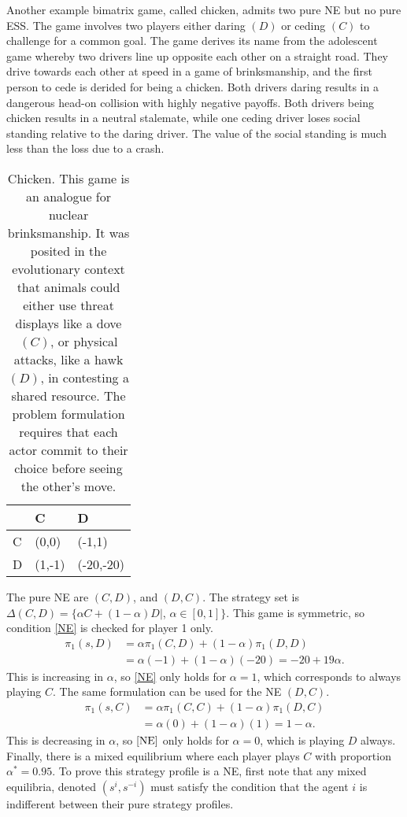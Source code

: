 Another example bimatrix game, called chicken, admits two pure NE but no pure ESS. The game involves two players either daring $(D)$ or ceding $(C)$ to challenge for a common goal. The game derives its name from the adolescent game whereby two drivers line up opposite each other on a straight road. They drive towards each other at speed in a game of brinksmanship, and the first person to cede is derided for being a chicken. Both drivers daring results in a dangerous head-on collision with highly negative payoffs. Both drivers being chicken results in a neutral stalemate, while one ceding driver loses social standing relative to the daring driver. The value of the social standing is much less than the loss due to a crash. \\

\FloatBarrier
\begin{table}[hbt!]
\begin{center}
\centering
\begin{tabular}{|l|l|l|}
\hline
  & C      & D         \\ \hline
C & (0,0)  & (-1,1)    \\ \hline
D & (1,-1) & (-20,-20) \\ \hline
\end{tabular}

\caption{Chicken. This game is an analogue for nuclear brinksmanship. It was posited in the evolutionary context that animals could either use threat displays like a dove $(C)$, or physical attacks, like a hawk $(D)$, in contesting a shared resource. The problem formulation requires that each actor commit to their choice before seeing the other's move.
}
\label{Chicken}
\end{center}
\end{table}
\FloatBarrier
The pure NE are $(C,D)$, and $(D,C)$. The strategy set is $\Delta(C,D) = \{\alpha C + (1-\alpha) D|$,   $\alpha \in [0,1] \}$. This game is symmetric, so condition \eqref{NE} is checked for player 1 only. \\
\begin{align*}
    \pi_1(s,D) &= \alpha\pi_1(C,D) + (1-\alpha)\pi_1(D,D) \\
    &= \alpha (-1) + (1-\alpha)(-20) = -20 + 19\alpha. 
\end{align*}
This is increasing in $\alpha$, so \eqref{NE} only holds for $\alpha = 1$, which corresponds to always playing $C$. The same formulation can be used for the NE $(D,C)$. \\
\begin{align*}
        \pi_1(s,C) &= \alpha\pi_1(C,C) + (1-\alpha)\pi_1(D,C) \\
    &= \alpha (0) + (1-\alpha)(1) = 1-\alpha. 
\end{align*}
This is decreasing in $\alpha$, so $\eqref{NE}$ only holds for $\alpha = 0$, which is playing $D$ always. Finally, there is a mixed equilibrium where each player plays $C$ with proportion $\alpha^* = 0.95$. To prove this strategy profile is a NE, first note that any mixed equilibria, denoted $( s^i, s^{-i})$ must satisfy the condition that the agent $i$ is indifferent between their pure strategy profiles. \\
